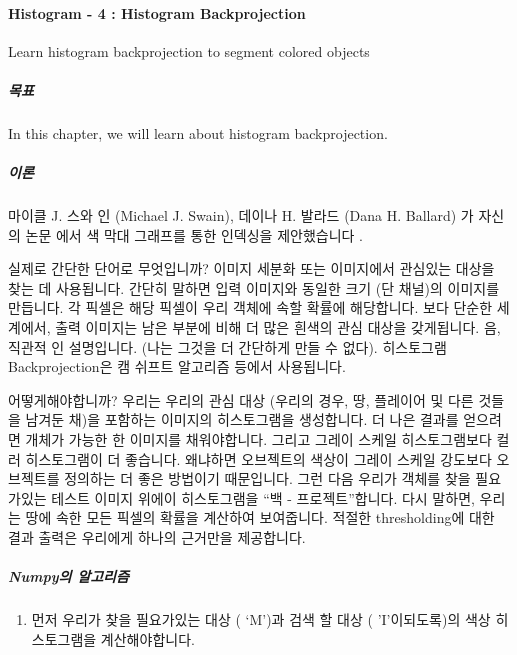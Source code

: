 \documentclass[11pt]{article}
\providecommand{\tightlist}{%
      \setlength{\itemsep}{0pt}\setlength{\parskip}{0pt}}
\begin{document}
    \hypertarget{histogram---4-histogram-backprojection}{%
\paragraph{Histogram - 4 : Histogram
Backprojection}\label{histogram---4-histogram-backprojection}}

Learn histogram backprojection to segment colored objects

\hypertarget{uxbaa9uxd45c}{%
\subparagraph{목표}\label{uxbaa9uxd45c}}

In this chapter, we will learn about histogram backprojection.

\hypertarget{uxc774uxb860}{%
\subparagraph{이론}\label{uxc774uxb860}}

마이클 J. 스와 인 (Michael J. Swain), 데이나 H. 발라드 (Dana H. Ballard)
가 자신의 논문 에서 색 막대 그래프를 통한 인덱싱을 제안했습니다 .

실제로 간단한 단어로 무엇입니까? 이미지 세분화 또는 이미지에서 관심있는
대상을 찾는 데 사용됩니다. 간단히 말하면 입력 이미지와 동일한 크기 (단
채널)의 이미지를 만듭니다. 각 픽셀은 해당 픽셀이 우리 객체에 속할 확률에
해당합니다. 보다 단순한 세계에서, 출력 이미지는 남은 부분에 비해 더 많은
흰색의 관심 대상을 갖게됩니다. 음, 직관적 인 설명입니다. (나는 그것을 더
간단하게 만들 수 없다). 히스토그램 Backprojection은 캠 쉬프트 알고리즘
등에서 사용됩니다.

어떻게해야합니까? 우리는 우리의 관심 대상 (우리의 경우, 땅, 플레이어 및
다른 것들을 남겨둔 채)을 포함하는 이미지의 히스토그램을 생성합니다. 더
나은 결과를 얻으려면 개체가 가능한 한 이미지를 채워야합니다. 그리고
그레이 스케일 히스토그램보다 컬러 히스토그램이 더 좋습니다. 왜냐하면
오브젝트의 색상이 그레이 스케일 강도보다 오브젝트를 정의하는 더 좋은
방법이기 때문입니다. 그런 다음 우리가 객체를 찾을 필요가있는 테스트
이미지 위에이 히스토그램을 ``백 - 프로젝트''합니다. 다시 말하면, 우리는
땅에 속한 모든 픽셀의 확률을 계산하여 보여줍니다. 적절한 thresholding에
대한 결과 출력은 우리에게 하나의 근거만을 제공합니다.

\hypertarget{numpyuxc758-uxc54cuxace0uxb9acuxc998}{%
\subparagraph{Numpy의
알고리즘}\label{numpyuxc758-uxc54cuxace0uxb9acuxc998}}

\begin{enumerate}
\def\labelenumi{\arabic{enumi}.}
\tightlist
\item
  먼저 우리가 찾을 필요가있는 대상 ( `M')과 검색 할 대상 (
  'I'이되도록)의 색상 히스토그램을 계산해야합니다.
\end{enumerate}
\end{document}
